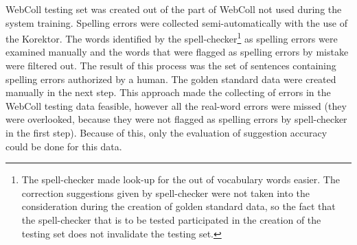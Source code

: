 \documentclass[11pt]{article}
\begin{document}
WebColl testing set was created out of the part of WebColl not used during the system training.
Spelling errors were collected semi-automatically with the use of the Korektor.
The words identified by the spell-checker\footnote{The spell-checker made
look-up for the out of vocabulary words easier. The correction suggestions
given by spell-checker were not taken into the consideration during the creation
of golden standard data, so the fact that the spell-checker that is to be
tested participated in the creation of the testing set does not invalidate the
testing set.} as spelling errors were examined manually and the words that were
flagged as spelling errors by mistake were filtered out. The result of this
process was the set of sentences containing spelling errors authorized by a
human. The golden standard data were created manually in the next step. This
approach made the collecting of errors in the WebColl testing data feasible,
however all the real-word errors were missed (they were overlooked, because
they were not flagged as spelling errors by spell-checker in the first step).
Because of this, only the evaluation of suggestion accuracy could be done for
this data.
\end{document}
